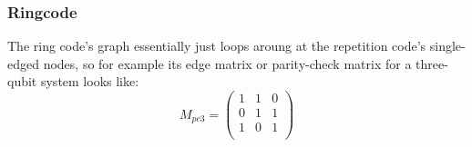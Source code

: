 \subsubsection{Ringcode}
The ring code's graph essentially just loops aroung at the repetition
code's single-edged nodes, so for example its edge matrix or parity-check
matrix for a three-qubit system looks like:
\begin{equation}
    M_{pc3} = \left(
        \begin{array}{ccc}
            1 & 1 & 0\\
            0 & 1 & 1\\
            1 & 0 & 1\\
        \end{array}
        \right)
\end{equation}
